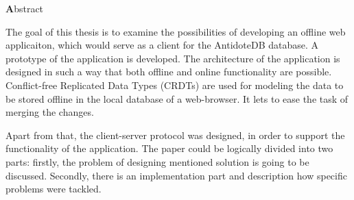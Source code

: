 
\begin{center}
{\Large \textbf Abstract}
\end{center}
\vspace{1cm}

The goal of this thesis is to examine the possibilities of developing an offline web applicaiton, 
which would serve as a client for the AntidoteDB database. A prototype of the application is developed. 
The architecture of the application is designed in such a way that both offline and online functionality are possible. 
Conflict-free Replicated Data Types (CRDTs) are used for modeling the data to be stored offline in the local database of 
a web-browser. It lets to ease the task of merging the changes. 

Apart from that, the client-server protocol was designed, in order to support the functionality of the application. 
The paper could be logically divided into two parts: firstly, the problem of designing mentioned solution is going
 to be discussed. Secondly, there is an implementation part and description how specific problems were tackled.